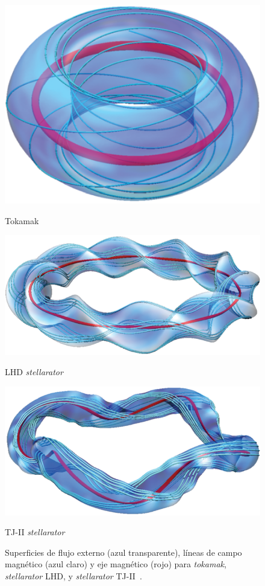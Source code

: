 \begin{figure}[H]
    \centering
            \includegraphics[width=\linewidth]{img/twist_1.png}
            \caption*{Tokamak}
        \endminipage\hfill
            \includegraphics[width=\linewidth]{img/twist_2.png}
            \caption*{LHD \textit{stellarator}}
        \endminipage\hfill
            \includegraphics[width=\linewidth]{img/twist_3.png}
            \caption*{TJ-II \textit{stellarator}}
        \endminipage
    \caption[Superficies de flujo externo, líneas de campo y eje magnéticos para \textit{tokamak}, \textit{stellarator} LHD, y \textit{stellarator} TJ-II]{Superficies de flujo externo (azul transparente), líneas de campo magnético (azul claro) y eje magnético
    (rojo) para \textit{tokamak}, \textit{stellarator} LHD, y \textit{stellarator} TJ-II~\cite{doi:10.1063/1.4921255}.}
    \label{fig:twist}
\end{figure}
